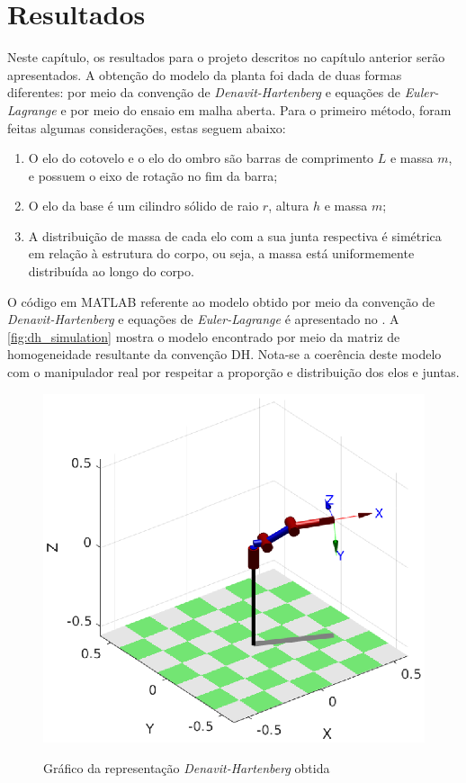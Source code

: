 \chapter{Resultados}

Neste capítulo, os resultados para o projeto descritos no capítulo anterior serão apresentados. A obtenção do modelo da 
planta foi dada de duas formas diferentes: por meio da convenção de \textit{Denavit-Hartenberg} e equações de 
\textit{Euler-Lagrange} e por meio do ensaio em malha aberta. Para o primeiro método, foram feitas algumas considerações,
estas seguem abaixo:
\begin{enumerate}
 \item O elo do cotovelo e o elo do ombro são barras de comprimento $L$ e massa $m$, e possuem o eixo de rotação no fim
 da barra;
 \item O elo da base é um cilindro sólido de raio $r$, altura $h$ e massa $m$;
 \item A distribuição de massa de cada elo com a sua junta respectiva é simétrica em relação à estrutura do corpo, ou seja,
 a massa está uniformemente distribuída ao longo do corpo.
\end{enumerate}

O código em MATLAB referente ao modelo obtido por meio da convenção de \textit{Denavit-Hartenberg} e equações de
\textit{Euler-Lagrange} é apresentado no . A \autoref{fig:dh_simulation} mostra 
o modelo encontrado por meio da matriz de homogeneidade resultante da convenção DH. Nota-se a coerência deste 
modelo com o manipulador real por respeitar a proporção e distribuição dos elos e juntas.

\begin{figure}[ht]
  \centering
  \caption{Gráfico da representação \textit{Denavit-Hartenberg} obtida}
  \includegraphics[width = 0.7\columnwidth]{Imagens/dh_simulation}
  \label{fig:dh_simulation} 
\end{figure}

